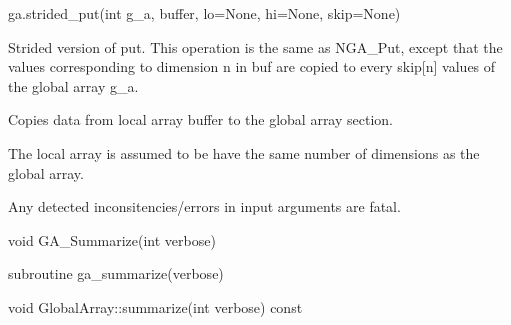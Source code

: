 \documentclass[12pt]{article}
\begin{document}
\begin{pyapi}
\begin{pycode}
ga.strided_put(int g_a, buffer, lo=None, hi=None, skip=None)
\end{pycode}
\begin{funcargs}
\end{funcargs}
\end{pyapi}

\ncoll

\begin{desc}

Strided version of put.  This operation is the same as NGA_Put, except that the
values corresponding to dimension n in buf are copied to every skip[n] values
of the global array g_a.

Copies data from local array buffer to the global array section.

The local array is assumed to be have the same number of dimensions as the
global array.

Any detected inconsitencies/errors in input arguments are fatal.

\end{desc}



\begin{capi}
\begin{ccode}
void GA_Summarize(int verbose)
\end{ccode}
\begin{funcargs}
\end{funcargs}
\end{capi}

\begin{fapi}
\begin{fcode}
subroutine ga_summarize(verbose)
\end{fcode}
\begin{funcargs}
\end{funcargs}
\end{fapi}

\begin{cxxapi}
\begin{cxxcode}
void GlobalArray::summarize(int verbose) const
\end{cxxcode}
\begin{funcargs}
\end{funcargs}
\end{cxxapi}
\end{document}
